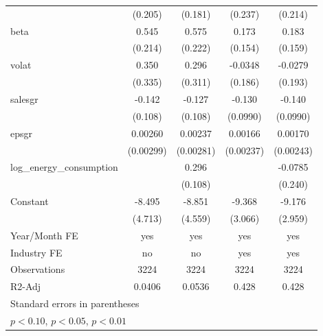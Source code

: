 \begin{table}[htbp]
\begin{tabular}{l*{4}{c}}
                    &     (0.205)         &     (0.181)         &     (0.237)         &     (0.214)         \\
[1em]
beta                &       0.545\sym{**} &       0.575\sym{**} &       0.173         &       0.183         \\
                    &     (0.214)         &     (0.222)         &     (0.154)         &     (0.159)         \\
[1em]
volat               &       0.350         &       0.296         &     -0.0348         &     -0.0279         \\
                    &     (0.335)         &     (0.311)         &     (0.186)         &     (0.193)         \\
[1em]
salesgr             &      -0.142         &      -0.127         &      -0.130         &      -0.140         \\
                    &     (0.108)         &     (0.108)         &    (0.0990)         &    (0.0990)         \\
[1em]
epsgr               &     0.00260         &     0.00237         &     0.00166         &     0.00170         \\
                    &   (0.00299)         &   (0.00281)         &   (0.00237)         &   (0.00243)         \\
[1em]
log\_energy\_consumption&                     &       0.296\sym{***}&                     &     -0.0785         \\
                    &                     &     (0.108)         &                     &     (0.240)         \\
[1em]
Constant            &      -8.495\sym{*}  &      -8.851\sym{*}  &      -9.368\sym{***}&      -9.176\sym{***}\\
                    &     (4.713)         &     (4.559)         &     (3.066)         &     (2.959)         \\
\hline
Year/Month FE       &         yes         &         yes         &         yes         &         yes         \\
Industry FE         &          no         &          no         &         yes         &         yes         \\
Observations        &        3224         &        3224         &        3224         &        3224         \\
R2-Adj              &      0.0406         &      0.0536         &       0.428         &       0.428         \\
\hline\hline
\multicolumn{5}{l}{\footnotesize Standard errors in parentheses}\\
\multicolumn{5}{l}{\footnotesize \sym{*} \(p<0.10\), \sym{**} \(p<0.05\), \sym{***} \(p<0.01\)}\\
\end{tabular}
\end{table}

